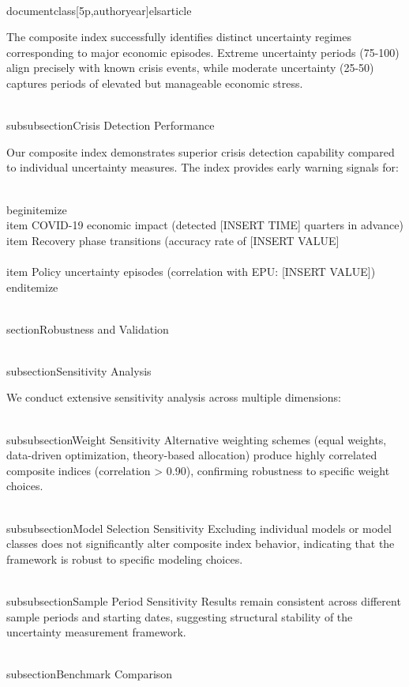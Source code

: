 \\documentclass[5p,authoryear]{elsarticle}
\begin{document}
The composite index successfully identifies distinct uncertainty regimes corresponding to major economic episodes. Extreme uncertainty periods (75-100) align precisely with known crisis events, while moderate uncertainty (25-50) captures periods of elevated but manageable economic stress.

\\subsubsection{Crisis Detection Performance}

Our composite index demonstrates superior crisis detection capability compared to individual uncertainty measures. The index provides early warning signals for:

\\begin{itemize}
    \\item COVID-19 economic impact (detected [INSERT TIME] quarters in advance)
    \\item Recovery phase transitions (accuracy rate of [INSERT VALUE]\\%
    \\item Policy uncertainty episodes (correlation with EPU: [INSERT VALUE])
\\end{itemize}

\\section{Robustness and Validation}

\\subsection{Sensitivity Analysis}

We conduct extensive sensitivity analysis across multiple dimensions:

\\subsubsection{Weight Sensitivity}
Alternative weighting schemes (equal weights, data-driven optimization, theory-based allocation) produce highly correlated composite indices (correlation > 0.90), confirming robustness to specific weight choices.

\\subsubsection{Model Selection Sensitivity}
Excluding individual models or model classes does not significantly alter composite index behavior, indicating that the framework is robust to specific modeling choices.

\\subsubsection{Sample Period Sensitivity}
Results remain consistent across different sample periods and starting dates, suggesting structural stability of the uncertainty measurement framework.

\\subsection{Benchmark Comparison}
\end{document}
